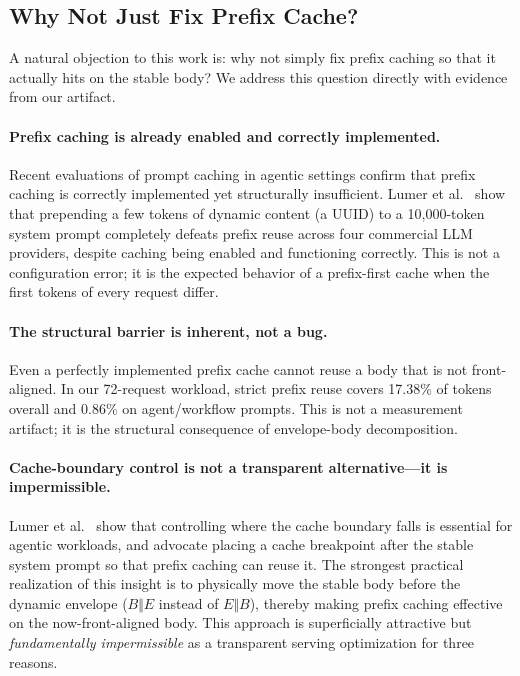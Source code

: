 \documentclass[conference]{IEEEtran}
\begin{document}
\subsection{Why Not Just Fix Prefix Cache?}

A natural objection to this work is: why not simply fix prefix caching so that it actually hits on the stable body? We address this question directly with evidence from our artifact.

\paragraph{Prefix caching is already enabled and correctly implemented.}
Recent evaluations of prompt caching in agentic settings confirm that prefix caching is correctly implemented yet structurally insufficient. Lumer et al.~\cite{lumer2026dontbreak} show that prepending a few tokens of dynamic content (a UUID) to a 10{,}000-token system prompt completely defeats prefix reuse across four commercial LLM providers, despite caching being enabled and functioning correctly. This is not a configuration error; it is the expected behavior of a prefix-first cache when the first tokens of every request differ.

\paragraph{The structural barrier is inherent, not a bug.}
Even a perfectly implemented prefix cache cannot reuse a body that is not front-aligned. In our 72-request workload, strict prefix reuse covers 17.38\% of tokens overall and 0.86\% on agent/workflow prompts. This is not a measurement artifact; it is the structural consequence of envelope-body decomposition.

\paragraph{Cache-boundary control is not a transparent alternative---it is impermissible.}
Lumer et al.~\cite{lumer2026dontbreak} show that controlling where the cache boundary falls is essential for agentic workloads, and advocate placing a cache breakpoint after the stable system prompt so that prefix caching can reuse it. The strongest practical realization of this insight is to physically move the stable body before the dynamic envelope ($B \Vert E$ instead of $E \Vert B$), thereby making prefix caching effective on the now-front-aligned body. This approach is superficially attractive but \emph{fundamentally impermissible} as a transparent serving optimization for three reasons.
\end{document}
